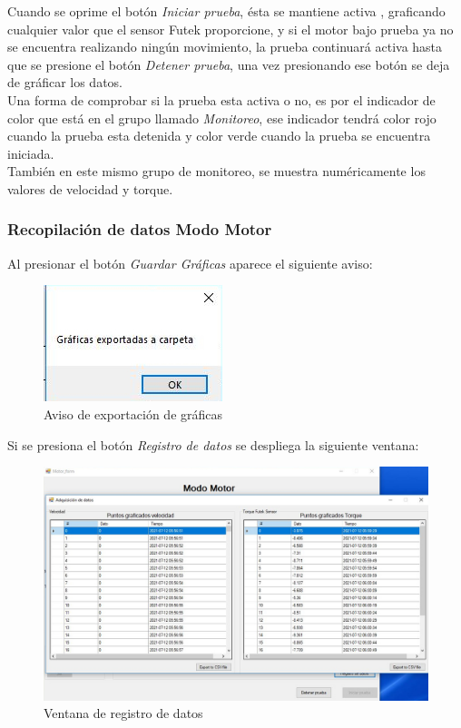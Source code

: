 \documentclass[12pt,titlepage]{article}
\begin{document}
Cuando se oprime el botón \textit{Iniciar prueba}, ésta se mantiene activa , graficando cualquier valor que el sensor Futek proporcione, y si el motor bajo prueba ya no se encuentra realizando ningún movimiento, la prueba continuará activa hasta que se presione el botón \textit{Detener prueba}, una vez presionando ese botón se deja de gráficar los datos.\\

Una forma de comprobar si la prueba esta activa o no, es por el indicador de color que está en el grupo llamado \textit{Monitoreo}, ese indicador tendrá color rojo cuando la prueba esta detenida y color verde cuando la prueba se encuentra iniciada. \\

También en este mismo grupo de monitoreo, se muestra numéricamente los valores de velocidad y torque. \\ 
 
\newpage
\subsubsection{Recopilación de datos Modo Motor}
Al presionar el botón \textit{Guardar Gráficas} aparece el siguiente aviso: \\ 
\begin{figure}[htbp]
\hspace*{6.8cm} 
\includegraphics[scale=0.65]{graphs}
\caption{Aviso de exportación de gráficas}
\end{figure}

Si se presiona el botón \textit{Registro de datos} se despliega la siguiente ventana: \\ 

\begin{figure}[htbp]
\hspace*{0.1cm} 
\includegraphics[scale=0.57]{datos}
\caption{Ventana de registro de datos}
\end{figure}
\end{document}
